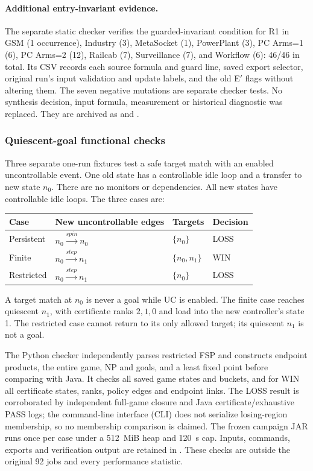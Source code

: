 \documentclass[11pt]{article}
\begin{document}
\paragraph{Additional entry-invariant evidence.}
The separate static checker  verifies the guarded-invariant condition for R1 in GSM (1 occurrence), Industry (3), MetaSocket (1), PowerPlant (3), PC Arms=1 (6), PC Arms=2 (12), Railcab (7), Surveillance (7), and Workflow (6): 46/46 in total. Its CSV records each source formula and guard line, saved export selector, original run's input validation and update labels, and the old E$'$ flags without altering them. The seven negative mutations are separate checker tests. No synthesis decision, input formula, measurement or historical diagnostic was replaced. They are archived as  and .

\subsubsection{Quiescent-goal functional checks}
Three separate one-run fixtures test a safe target match with an enabled uncontrollable event. One old state has a controllable idle loop and a transfer to new state $n_0$. There are no monitors or dependencies. All new states have controllable idle loops. The three cases are:
\begin{center}\small
\begin{tabular}{@{}llll@{}}\toprule
Case & New uncontrollable edges & Targets & Decision\\\midrule
Persistent & $n_0\xrightarrow{spin}n_0$ & $\{n_0\}$ & LOSS\\
Finite & $n_0\xrightarrow{step}n_1$ & $\{n_0,n_1\}$ & WIN\\
Restricted & $n_0\xrightarrow{step}n_1$ & $\{n_0\}$ & LOSS\\\bottomrule
\end{tabular}
\end{center}
A target match at $n_0$ is never a goal while UC is enabled. The finite case reaches quiescent $n_1$, with certificate ranks $2,1,0$ and load into the new controller's state 1. The restricted case cannot return to its only allowed target; its quiescent $n_1$ is not a goal.

The Python checker independently parses restricted FSP and constructs endpoint products, the entire game, NP and goals, and a least fixed point before comparing with Java. It checks all saved game states and buckets, and for WIN all certificate states, ranks, policy edges and endpoint links. The LOSS result is corroborated by independent full-game closure and Java certificate/exhaustive PASS logs; the command-line interface (CLI) does not serialize losing-region membership, so no membership comparison is claimed. The frozen campaign JAR runs once per case under a 512~MiB heap and 120~s cap. Inputs, commands, exports and verification output are retained in . These checks are outside the original 92 jobs and every performance statistic.
\end{document}
